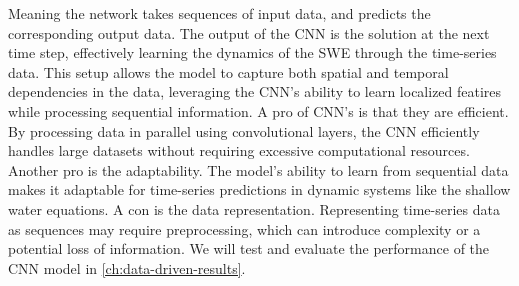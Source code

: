 Meaning the network takes sequences of input data, and predicts the corresponding output data.
The output of the CNN is the solution at the next time step, effectively learning the dynamics of the SWE through the time-series data.
This setup allows the model to capture both spatial and temporal dependencies in the data, leveraging the CNN's ability to learn localized featires while processing sequential information.
A pro of CNN's is that they are efficient. By processing data in parallel using convolutional layers, the CNN efficiently handles large datasets without requiring excessive computational resources.
Another pro is the adaptability. 
The model's ability to learn from sequential data makes it adaptable for time-series predictions in dynamic systems like the shallow water equations.
A con is the data representation. Representing time-series data as sequences may require preprocessing, which can introduce complexity or a potential loss of information.
We will test and evaluate the performance of the CNN model in \autoref{ch:data-driven-results}.






